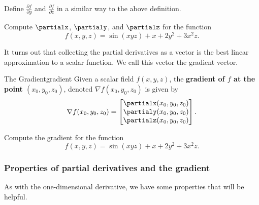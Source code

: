         \begin{exercise}
        Define $\frac{\partial f}{\partial y}$ and $\frac{\partial f}{\partial z}$ in a similar way to the above definition.
        \end{exercise}
        
        \begin{exercise}
        Compute $\partialx$, $\partialy$, and $\partialz$ for the function 
        \[
        f(x,y,z)=\sin(xyz)+x+2y^2+3x^2z.
        \]
        \end{exercise}
        
        It turns out that collecting the partial derivatives as a vector is the best linear approximation to a scalar function.  We call this vector the gradient vector.
        
        \begin{df}{The Gradient}{gradient}
        Given a scalar field $f(x,y,z)$, the \textbf{gradient of $f$ at the point $(x_0,y_0,z_0)$}, denoted $\nabla f(x_0,y_0,z_0)$ is given by
        \[
        \nabla f(x_0,y_0,z_0)=\begin{bmatrix} \partialx(x_0,y_0,z_0)\\ \partialy(x_0,y_0,z_0)\\ \partialz(x_0,y_0,z_0)\end{bmatrix}.
        \]
        \end{df}
        
        \begin{exercise}
        Compute the gradient for the function
        \[
        f(x,y,z)=\sin(xyz)+x+2y^2+3x^2z.
        \]
        \end{exercise}
        
        \subsubsection{Properties of partial derivatives and the gradient}
        
        As with the one-dimensional derivative, we have some properties that will be helpful.\\
        
